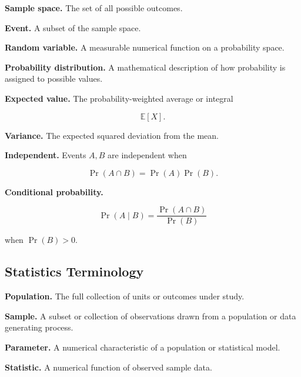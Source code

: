 \textbf{Sample space.}
The set of all possible outcomes.

\medskip

\textbf{Event.}
A subset of the sample space.

\medskip

\textbf{Random variable.}
A measurable numerical function on a probability space.

\medskip

\textbf{Probability distribution.}
A mathematical description of how probability is assigned to possible
values.

\medskip

\textbf{Expected value.}
The probability-weighted average or integral

\[
\boxed{
\mathbb{E}[X].
}
\]

\medskip

\textbf{Variance.}
The expected squared deviation from the mean.

\medskip

\textbf{Independent.}
Events \(A,B\) are independent when

\[
\boxed{
\Pr(A\cap B)
=
\Pr(A)\Pr(B).
}
\]

\medskip

\textbf{Conditional probability.}

\[
\boxed{
\Pr(A\mid B)
=
\frac{
\Pr(A\cap B)
}{
\Pr(B)
}
}
\]

when \(\Pr(B)>0\).

\subsection{Statistics Terminology}
\label{subsec:statistics-terminology-reference}

\textbf{Population.}
The full collection of units or outcomes under study.

\medskip

\textbf{Sample.}
A subset or collection of observations drawn from a population or data
generating process.

\medskip

\textbf{Parameter.}
A numerical characteristic of a population or statistical model.

\medskip

\textbf{Statistic.}
A numerical function of observed sample data.

\medskip

